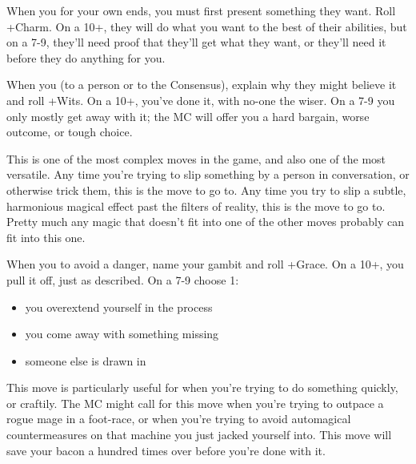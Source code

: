 \begin{multicols}{3}
  \SEPARATOR

  \begin{move}
    When you  for your own ends, you must first
    present something they want. Roll +Charm. On a 10+, they will do
    what you want to the best of their abilities, but on a 7-9,
    they'll need proof that they'll get what they want, or they'll
    need it before they do anything for you.
  \end{move}

  \columnbreak
    
  \begin{move}
    When you  (to a person or to the Consensus),
    explain why they might believe it and roll +Wits. On a 10+, you've
    done it, with no-one the wiser. On a 7-9 you only mostly get away
    with it; the MC will offer you a hard bargain, worse outcome, or
    tough choice.
\begin{movedetail}
  This is one of the most complex moves in the game, and also one of
  the most versatile. Any time you're trying to slip something by a
  person in conversation, or otherwise trick them, this is the move to
  go to. Any time you try to slip a subtle, harmonious magical
  effect past the filters of reality, this is the move to go
  to. Pretty much any magic that doesn't fit into one of the other
  moves probably can fit into this one.
\end{movedetail}
  \end{move}

  \vspace{1em}
  
  \SEPARATOR

  \begin{move}
    When you  to avoid a
    danger, name your gambit and roll +Grace. On a 10+, you pull it
    off, just as described. On a 7-9 choose 1:
    \begin{itemize}
      \setlength\itemsep{0em}
      \item you overextend yourself in the process
      \item you come away with something missing
      \item someone else is drawn in
    \end{itemize}
\begin{movedetail}
  This move is particularly useful for when you're trying to do
  something quickly, or craftily. The MC might call for this move when
  you're trying to outpace a rogue mage in a foot-race, or when you're
  trying to avoid automagical countermeasures on that machine you just
  jacked yourself into. This move will save your bacon a hundred times
  over before you're done with it.
\end{movedetail}
  \end{move}


\end{multicols}
